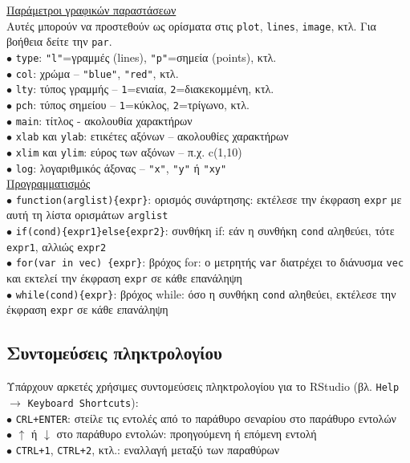 \documentclass[a4paper,10pt,twocolumn]{article}
\begin{document}
\noindent \underline{Παράμετροι γραφικών παραστάσεων}\\
Αυτές μπορούν να προστεθούν ως ορίσματα στις \texttt{plot}, \texttt{lines}, \texttt{image}, κτλ. Για βοήθεια
δείτε την \texttt{par}.\\
$\bullet$ \texttt{type}: \texttt{"l"}=γραμμές (lines), \texttt{"p"}=σημεία (points), κτλ.\\
$\bullet$ \texttt{col}: χρώμα -- \texttt{"blue"}, \texttt{"red"}, κτλ.\\
$\bullet$ \texttt{lty}: τύπος γραμμής -- \texttt{1}=ενιαία, \texttt{2}=διακεκομμένη, κτλ.\\
$\bullet$ \texttt{pch}: τύπος σημείου -- \texttt{1}=κύκλος, \texttt{2}=τρίγωνο, κτλ.\\
$\bullet$ \texttt{main}: τίτλος - ακολουθία χαρακτήρων\\
$\bullet$ \texttt{xlab} και \texttt{ylab}: ετικέτες αξόνων -- ακολουθίες χαρακτήρων\\
$\bullet$ \texttt{xlim} και \texttt{ylim}: εύρος των αξόνων -- π.χ. c(1,10)\\ 
$\bullet$ \texttt{log}: λογαριθμικός άξονας -- \texttt{"x"}, \texttt{"y"} ή \texttt{"xy"}\\

\noindent \underline{Προγραμματισμός}\\
$\bullet$ \verb!function(arglist){expr}!: ορισμός συνάρτησης: εκτέλεσε την έκφραση \texttt{expr} με αυτή τη
λίστα ορισμάτων \texttt{arglist} \\ 
$\bullet$ \verb!if(cond){expr1}else{expr2}!: συνθήκη if: εάν η συνθήκη \texttt{cond} αληθεύει, τότε
\texttt{expr1}, αλλιώς \texttt{expr2} \\
$\bullet$ \verb!for(var in vec) {expr}!: βρόχος for: ο μετρητής \texttt{var} διατρέχει το διάνυσμα \texttt{vec}
και εκτελεί την έκφραση \texttt{expr} σε κάθε επανάληψη \\
$\bullet$ \verb!while(cond){expr}!: βρόχος while: όσο η συνθήκη \texttt{cond} αληθεύει, εκτέλεσε την έκφραση
\texttt{expr} σε κάθε επανάληψη \\

\subsection{Συντομεύσεις πληκτρολογίου}

Υπάρχουν αρκετές χρήσιμες συντομεύσεις πληκτρολογίου για το RStudio (βλ. \texttt{Help} $\rightarrow$
\texttt{Keyboard Shortcuts}):\\
$\bullet$ \texttt{CRL+ENTER}: στείλε τις εντολές από το παράθυρο σεναρίου στο παράθυρο εντολών\\
$\bullet$ $\uparrow$ ή $\downarrow$ στο παράθυρο εντολών: προηγούμενη ή επόμενη εντολή\\
$\bullet$ \texttt{CTRL+1}, \texttt{CTRL+2}, κτλ.: εναλλαγή μεταξύ των παραθύρων\\
\end{document}
